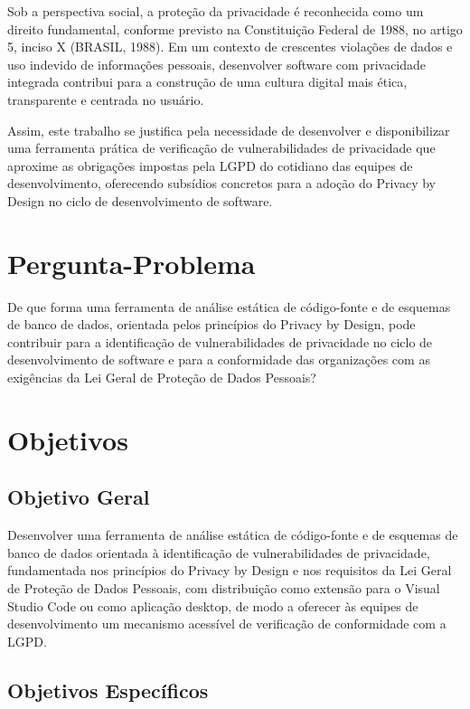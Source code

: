 \documentclass[oneside]{normas-utf-tex}
\begin{document}
Sob a perspectiva social, a proteção da privacidade é reconhecida como um direito fundamental, conforme previsto na Constituição Federal de 1988, no artigo 5, inciso X (BRASIL, 1988). Em um contexto de crescentes violações de dados e uso indevido de informações pessoais, desenvolver software com privacidade integrada contribui para a construção de uma cultura digital mais ética, transparente e centrada no usuário.

Assim, este trabalho se justifica pela necessidade de desenvolver e disponibilizar uma ferramenta prática de verificação de vulnerabilidades de privacidade que aproxime as obrigações impostas pela LGPD do cotidiano das equipes de desenvolvimento, oferecendo subsídios concretos para a adoção do Privacy by Design no ciclo de desenvolvimento de software.

\section{Pergunta-Problema}

De que forma uma ferramenta de análise estática de código-fonte e de esquemas de banco de dados, orientada pelos princípios do Privacy by Design, pode contribuir para a identificação de vulnerabilidades de privacidade no ciclo de desenvolvimento de software e para a conformidade das organizações com as exigências da Lei Geral de Proteção de Dados Pessoais?

\section{Objetivos}

\subsection{Objetivo Geral}

Desenvolver uma ferramenta de análise estática de código-fonte e de esquemas de banco de dados orientada à identificação de vulnerabilidades de privacidade, fundamentada nos princípios do Privacy by Design e nos requisitos da Lei Geral de Proteção de Dados Pessoais, com distribuição como extensão para o Visual Studio Code ou como aplicação desktop, de modo a oferecer às equipes de desenvolvimento um mecanismo acessível de verificação de conformidade com a LGPD.

\subsection{Objetivos Específicos}
\end{document}
